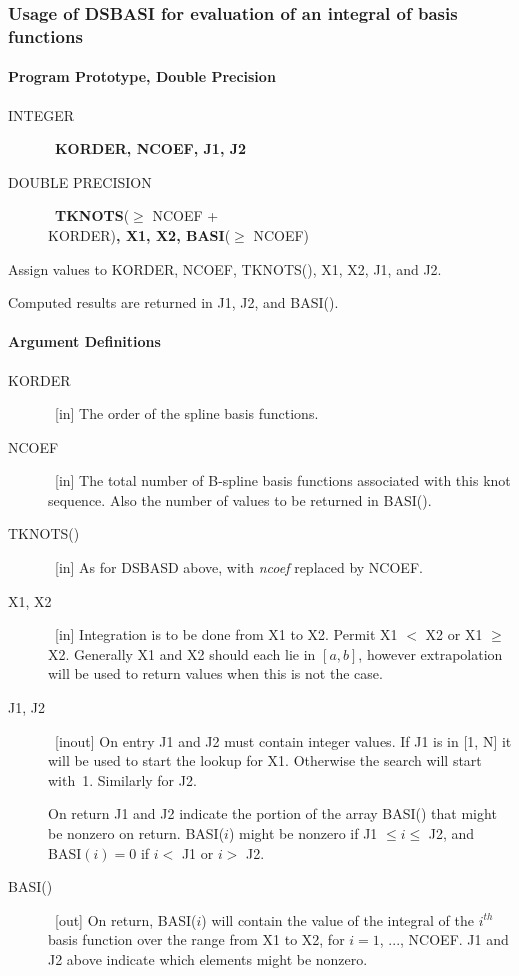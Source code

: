 \documentclass[twoside]{MATH77}
\begin{document}
\subsubsection{Usage of DSBASI for evaluation of an integral of basis
functions}

\paragraph{Program Prototype, Double Precision}
\begin{description}
\item[INTEGER]  \ {\bf KORDER, NCOEF, J1, J2}

\item[DOUBLE PRECISION]  \ {\bf TKNOTS}($\geq $ NCOEF +\\ KORDER){\bf , X1,
X2, BASI}($\geq $ NCOEF)
\end{description}
Assign values to KORDER, NCOEF, TKNOTS(), X1, X2, J1, and J2.
\begin{center}
\end{center}
Computed results are returned in J1, J2, and BASI().

\paragraph{Argument Definitions}
\begin{description}
\item[KORDER]  \ [in] The order of the spline basis functions.

\item[NCOEF]  \ [in] The total number of B-spline basis functions associated
with this knot sequence. Also the number of values to be returned in BASI().

\item[TKNOTS()]  \ [in] As for DSBASD above, with {\em ncoef} replaced by
NCOEF.

\item[X1, X2]  \ [in] Integration is to be done from X1 to X2. Permit X1 $<$
X2 or X1 $\geq $ X2. Generally X1 and X2 should each lie in $[a,b]$, however
extrapolation will be used to return values when this is not the case.

\item[J1, J2]  \ [inout] On entry J1 and J2 must contain integer values. If
J1 is in [1, N] it will be used to start the lookup for X1. Otherwise the
search will start with~1. Similarly for J2.

On return J1 and J2 indicate the portion of the array BASI() that might be
nonzero on return. BASI($i$) might be nonzero if J1 $\leq i\leq $ J2, and BASI$%
(i)=0$ if $i<$ J1 or $i>$ J2.

\item[BASI()]  \ [out] On return, BASI($i$) will contain the value of the
integral of the $i^{th}$ basis function over the range from X1 to X2, for $i=1$,
..., NCOEF. J1 and J2 above indicate which elements might be nonzero.
\end{description}
\end{document}
